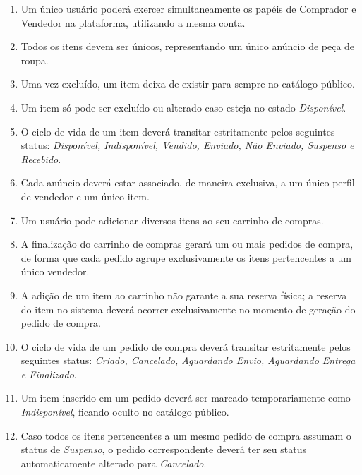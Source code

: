 \documentclass[
	article,			%
	11pt,				%
	oneside,			%
	a4paper,			%
	english,			%
	brazil,				%
	sumario=tradicional
	]{abntex2}
\begin{document}
\begin{enumerate}[label=RD\arabic*:]

    \item Um único usuário poderá exercer simultaneamente os papéis de Comprador e Vendedor na plataforma, utilizando a mesma conta.

    \item Todos os itens devem ser únicos, representando um único anúncio de peça de roupa.

    \item Uma vez excluído, um item deixa de existir para sempre no catálogo público.

    \item Um item só pode ser excluído ou alterado caso esteja no estado \textit{Disponível}.
    
    \item O ciclo de vida de um item deverá transitar estritamente pelos seguintes status: \textit{Disponível, Indisponível, Vendido, Enviado, Não Enviado, Suspenso e Recebido}.

    \item Cada anúncio deverá estar associado, de maneira exclusiva, a um único perfil de vendedor e um único item.

    \item Um usuário pode adicionar diversos itens ao seu carrinho de compras.

    \item A finalização do carrinho de compras gerará um ou mais pedidos de compra, de forma que cada pedido agrupe exclusivamente os itens pertencentes a um único vendedor.

     \item A adição de um item ao carrinho não garante a sua reserva física; a reserva do item no sistema deverá ocorrer exclusivamente no momento de geração do pedido de compra.

    \item O ciclo de vida de um pedido de compra deverá transitar estritamente pelos seguintes status: \textit{Criado, Cancelado, Aguardando Envio, Aguardando Entrega e Finalizado}.

    \item Um item inserido em um pedido deverá ser marcado temporariamente como \textit{Indisponível}, ficando oculto no catálogo público.

    \item Caso todos os itens pertencentes a um mesmo pedido de compra assumam o status de \textit{Suspenso}, o pedido correspondente deverá ter seu status automaticamente alterado para \textit{Cancelado}.


\end{enumerate}
\end{document}
